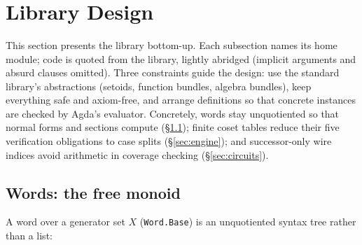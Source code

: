 \begin{code}[hide]
\AgdaSymbol{:}\AgdaSpace{}%
\AgdaSpace{}%
\AgdaSymbol{\{}\AgdaSymbol{\}}\AgdaSpace{}%
\AgdaSymbol{\{}\AgdaSpace{}%
\AgdaSymbol{:}\AgdaSpace{}%
\AgdaSpace{}%
\AgdaSymbol{\}}\AgdaSpace{}%
\AgdaSpace{}%
\<%
\\
%
\>[2]\AgdaSpace{}%
\AgdaSpace{}%
\AgdaSpace{}%
\AgdaSpace{}%
\AgdaSpace{}%
%
\>[15]\AgdaSymbol{:}\AgdaSpace{}%
\<%
\\
%
\>[2]\AgdaSpace{}%
\AgdaSpace{}%
\AgdaSpace{}%
%
\>[15]\AgdaSymbol{:}\AgdaSpace{}%
\<%
\\
%
\>[2]\AgdaSpace{}%
%
\>[15]\AgdaSymbol{:}\AgdaSpace{}%
\<%
\end{code}
\section{Library Design}\label{sec:design}

This section presents the library bottom-up.  Each subsection names its
home module; code is quoted from the library, lightly abridged (implicit
arguments and absurd clauses omitted).  Three constraints guide the design:
use the standard library's abstractions (setoids, function bundles, algebra
bundles), keep everything safe and axiom-free, and arrange definitions so
that concrete instances are checked by Agda's evaluator.
Concretely, words stay unquotiented so that normal forms and sections
compute (\S\ref{sec:words}); finite coset tables reduce their five
verification obligations to case splits (\S\ref{sec:engine}); and
successor-only wire indices avoid arithmetic in coverage checking
(\S\ref{sec:circuits}).

\subsection{Words: the free monoid}\label{sec:words}

A word over a generator set $X$ (\texttt{Word.Base}) is an unquotiented
syntax tree rather than a list:

